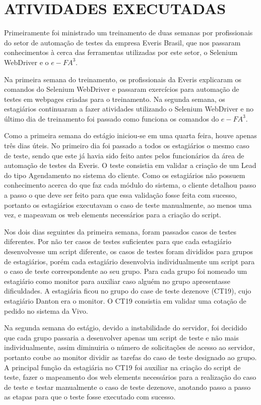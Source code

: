 \section{ATIVIDADES EXECUTADAS}


Primeiramente foi ministrado um treinamento de duas semanas por profissionais do setor de automação de testes da empresa Everis Brasil, que nos passaram conhecimentos à cerca das ferramentas utilizadas por este setor, o Selenium WebDriver e o $e-FA^{3}$.

Na primeira semana do treinamento, os profissionais da Everis explicaram os comandos do Selenium WebDriver e passaram exercícios para automação de testes em webpages criadas para o treinamento. Na segunda semana, os estagiários continuaram a fazer atividades utilizando o Selenium WebDriver e no último dia de treinamento foi passado como funciona os comandos do $e-FA^{3}$.

Como a primeira semana do estágio iniciou-se em uma quarta feira, houve apenas três dias úteis. No primeiro dia foi passado a todos os estagiários o mesmo caso de teste, sendo que este já havia sido feito antes pelos funcionários da área de automação de testes da Everis. O teste consistia em validar a criação de um Lead do tipo Agendamento no sistema do cliente. Como os estagiários não possuem conhecimento acerca do que faz cada módulo do sistema, o cliente detalhou passo a passo o que deve ser feito para que essa validação fosse feita com sucesso, portanto os estagiários executavam o caso de teste manualmente, ao menos uma vez, e mapeavam os web elements necessários para a criação do script.

Nos dois dias seguintes da primeira semana, foram passados casos de testes diferentes. Por não ter casos de testes suficientes para que cada estagiário desenvolvesse um script diferente, os casos de testes foram divididos para grupos de estagiários, porém cada estagiário desenvolvia individualmente um script para o caso de teste correspondente ao seu grupo. Para cada grupo foi nomeado um estagiário como monitor para auxiliar caso alguém no grupo apresentasse dificuldades. A estagiária ficou no grupo do case de teste dezenove (CT19), cujo estagiário Danton era o monitor. O CT19 consistia em validar uma cotação de pedido no sistema da Vivo.

Na segunda semana do estágio, devido a instabilidade do servidor, foi decidido que cada grupo passaria a desenvolver apenas um script de teste e não mais individualmente, assim diminuiria o número de solicitações de acesso ao servidor, portanto coube ao monitor dividir as tarefas do caso de teste designado ao grupo. A principal função da estagiária no CT19 foi auxiliar na criação do script de teste, fazer o mapeamento dos web elements necessários para a realização do caso de teste e testar manualmente o caso de teste dezenove, anotando passo a passo as etapas para que o teste fosse executado com sucesso.

